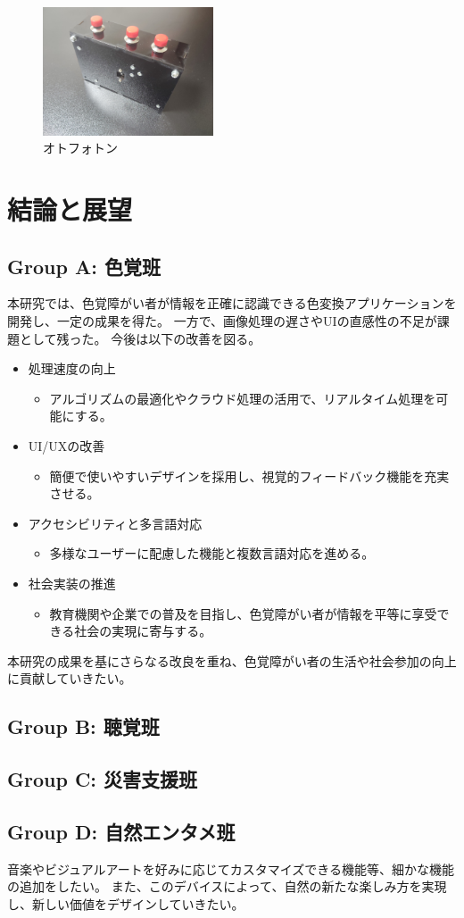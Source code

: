 \begin{figure}[h]
  \centering
  \includegraphics[width=0.45\textwidth]{pages/report/images/otophoton.jpg}
  \caption{オトフォトン}
  \label{fig:otophoton}
\end{figure}

\section{結論と展望}
\subsection{Group A: 色覚班}
本研究では、色覚障がい者が情報を正確に認識できる色変換アプリケーションを開発し、一定の成果を得た。
一方で、画像処理の遅さやUIの直感性の不足が課題として残った。
今後は以下の改善を図る。
\begin{itemize}
  \item 処理速度の向上
  \begin{itemize}
    \item アルゴリズムの最適化やクラウド処理の活用で、リアルタイム処理を可能にする。
  \end{itemize}
  \item UI/UXの改善
  \begin{itemize}
    \item 簡便で使いやすいデザインを採用し、視覚的フィードバック機能を充実させる。
  \end{itemize}
  \item アクセシビリティと多言語対応
  \begin{itemize}
    \item 多様なユーザーに配慮した機能と複数言語対応を進める。
  \end{itemize}
  \item 社会実装の推進
  \begin{itemize}
    \item 教育機関や企業での普及を目指し、色覚障がい者が情報を平等に享受できる社会の実現に寄与する。
  \end{itemize}
\end{itemize}
  本研究の成果を基にさらなる改良を重ね、色覚障がい者の生活や社会参加の向上に貢献していきたい。

\subsection{Group B: 聴覚班}

\subsection{Group C: 災害支援班}

\subsection{Group D: 自然エンタメ班}
音楽やビジュアルアートを好みに応じてカスタマイズできる機能等、細かな機能の追加をしたい。
また、このデバイスによって、自然の新たな楽しみ方を実現し、新しい価値をデザインしていきたい。

